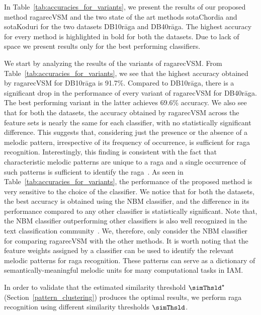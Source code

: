 In Table~\ref{tab:accuracies_for_variants}, we present the results of our proposed method \acrshort{ragarecVSM} and the two state of the art methods \acrshort{sotaChordia} and \acrshort{sotaKoduri} for the two datasets DB10r\={a}ga and DB40r\={a}ga. The highest accuracy for every method is highlighted in bold for both the datasets. Due to lack of space we present results only for the best performing classifiers. 

We start by analyzing the results of the variants of \acrshort{ragarecVSM}. From Table~\ref{tab:accuracies_for_variants}, we see that the highest accuracy obtained by \acrshort{ragarecVSM} for DB10r\={a}ga is 91.7\%. Compared to DB10r\={a}ga, there is a significant drop in the performance of every variant of \acrshort{ragarecVSM} for DB40r\={a}ga. The best performing variant in the latter achieves 69.6\% accuracy. We also see that for both the datasets, the accuracy obtained by \acrshort{ragarecVSM} across the feature sets is nearly the same for each classifier, with no statistically significant difference. This suggests that, considering just the presence or the absence of a melodic pattern, irrespective of its frequency of occurrence, is sufficient for \gls{raga} recognition. Interestingly, this finding is consistent with the fact that characteristic melodic patterns are unique to a \gls{raga} and a single occurrence of such patterns is sufficient to identify the \gls{raga}~\cite{krishna2012carnatic}. As seen in Table~\ref{tab:accuracies_for_variants}, the performance of the proposed method is very sensitive to the choice of the classifier. We notice that for both the datasets, the best accuracy is obtained using the NBM classifier, and the difference in its performance compared to any other classifier is statistically significant. Note that, the NBM classifier outperforming other classifiers is also well recognized in the text classification community~\cite{mccallum1998comparison}. We, therefore, only consider the NBM classifier for comparing \acrshort{ragarecVSM} with the other methods. It is worth noting that the feature weights assigned by a classifier can be used to identify the relevant melodic patterns for \gls{raga} recognition. These patterns can serve as a dictionary of semantically-meaningful melodic units for many computational tasks in IAM.

In order to validate that the estimated similarity threshold $\simThsld^\star$ (Section~\ref{pattern_clustering}) produces the optimal results, we perform \gls{raga} recognition using different similarity thresholds $\simThsld$. 

